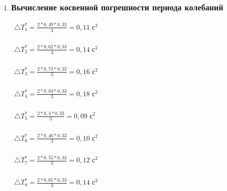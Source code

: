 \begin{enumerate}
		\item \subsubsection*{Вычисление косвенной погрешности периода колебаний}
		\label{appendix: 8}
		\begin{multicols}{2}
			\(\begin{aligned}\triangle T_1^* = \frac{2*0,49*0,33}{3} = 0,11 \text{ с}^2\end{aligned}\) \\\\
			\(\begin{aligned}\triangle T_2^* = \frac{2*0,62*0,33}{3} = 0,14 \text{ с}^2\end{aligned}\) \\\\
			\(\begin{aligned}\triangle T_3^* = \frac{2*0,73*0,33}{3} = 0,16 \text{ с}^2\end{aligned}\) \\\\
			\(\begin{aligned}\triangle T_4^* = \frac{2*0,83*0,33}{3} = 0,18 \text{ с}^2\end{aligned}\) \\\\
			\(\begin{aligned}\triangle T_5^* = \frac{2*0,4*0,33}{3} = 0,09 \text{ с}^2\end{aligned}\) \\\\
			\(\begin{aligned}\triangle T_6^* = \frac{2*0,46*0,33}{3} = 0,10 \text{ с}^2\end{aligned}\) \\\\
			\(\begin{aligned}\triangle T_7^* = \frac{2*0,55*0,33}{3} = 0,12 \text{ с}^2\end{aligned}\) \\\\
			\(\begin{aligned}\triangle T_8^* = \frac{2*0,65*0,33}{3} = 0,14 \text{ с}^2\end{aligned}\) \\\\
		\end{multicols}
		

\end{enumerate}

